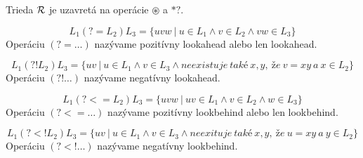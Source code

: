 \begin{dosledok}
Trieda ${\cal R}$ je uzavretá na operácie $\circledast$ a $*?$.
\end{dosledok}

\begin{df}
$$ L_{1}(?=L_{2})L_{3} = \lbrace uvw ~|~ u \in L_{1} \land v \in L_{2} \land vw \in L_{3} \rbrace $$ Operáciu $(?=\dots)$ nazývame pozitívny lookahead alebo len lookahead.
\end{df}

\begin{df}
$$ L_{1}(?!L_{2})L_{3} = \lbrace uv ~|~ u \in L_{1} \land v \in L_{3} \land neexistuje~také~x,y,~že~v=xy~a~x \in L_2 \rbrace $$ Operáciu $(?!\dots)$ nazývame negatívny lookahead.
\end{df}

\begin{df}
$$ L_{1}(?<=L_{2})L_{3} = \lbrace uvw ~|~ uv \in L_{1} \land v \in L_{2} \land w \in L_{3} \rbrace $$ Operáciu $(?<=\dots)$ nazývame pozitívny lookbehind alebo len lookbehind.
\end{df}

\begin{df}
$$ L_{1}(?<!L_{2})L_{3} = \lbrace uv ~|~ u \in L_{1} \land v \in L_{3} \land neexituje~také~x,y,~že~u=xy~a~y \in L_2 \rbrace $$ Operáciu $(?<!\dots)$ nazývame negatívny lookbehind.
\end{df}

